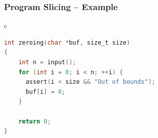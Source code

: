 \documentclass[sans]{beamer}
\begin{document}
\begin{frame}[fragile]
\frametitle{Program Slicing -- Example}
\begin{center}
\begin{tabular}{c}
\begin{lstlisting}[language=C]
int zeroing(char *buf, size_t size)
{
    int n = input();
    for (int i = 0; i < n; ++i) {
      assert(i < size && "Out of bounds");
      buf[i] = 0;
    }

    return 0;
}
\end{lstlisting}
\end{tabular}
\pause
{}
\end{center}
\end{frame}
\end{document}
